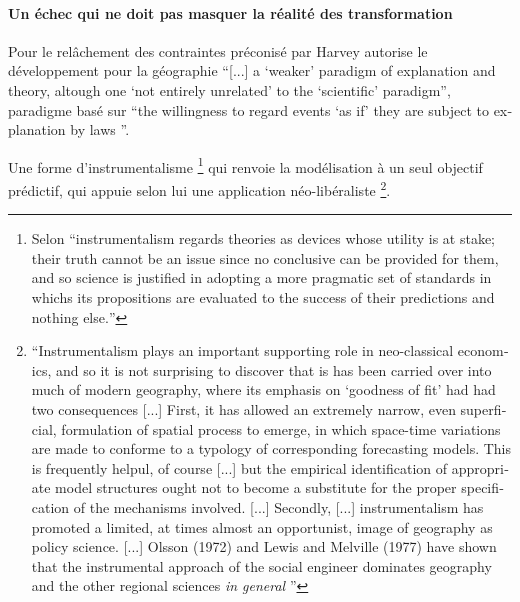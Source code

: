 \paragraph{Un échec qui ne doit pas masquer la réalité des transformation}


Pour \textcite[41]{Gregory1978} le relâchement des contraintes préconisé par Harvey \autocite[47]{Paterson1984} autorise le développement pour la géographie \foreignquote{english}{[...] a \enquote{weaker} paradigm of explanation and theory, altough one \enquote{not entirely unrelated} to the \enquote{scientific} paradigm}, paradigme basé sur \foreignquote{english}{the willingness to regard events \enquote{as if} they are subject to explanation by laws \autocite[174]{Harvey1969}}. 

Une forme d'instrumentalisme \footnote{Selon \textcite{Gregory1978} \foreignquote{english}{instrumentalism regards theories as devices whose utility is at stake; their truth cannot be an issue since no conclusive can be provided for them, and so science is justified in adopting a more pragmatic set of standards in whichs its propositions are evaluated to the success of their predictions and nothing else.}} qui renvoie la modélisation à un seul objectif prédictif, qui appuie selon lui une application néo-libéraliste \footnote{\foreignquote{english}{Instrumentalism plays an important supporting role in neo-classical economics, and so it is not surprising to discover that is has been carried over into much of modern geography, where its emphasis on \foreignquote{english}{goodness of fit} had had two consequences [...] First, it has allowed an extremely narrow, even superficial, formulation of spatial process to emerge, in which space-time variations are made to conforme to a typology of corresponding forecasting models. This is frequently helpul, of course [...] but the empirical identification of appropriate model structures ought not to become a substitute for the proper specification of the mechanisms involved. [...] Secondly, [...] instrumentalism has promoted a limited, at times almost an opportunist, image of geography as policy science. [...] Olsson (1972) and Lewis and Melville (1977) have shown that the instrumental approach of the social engineer dominates geography and the other regional sciences \textit{in general} \autocite{Gregory1978}}}. 

